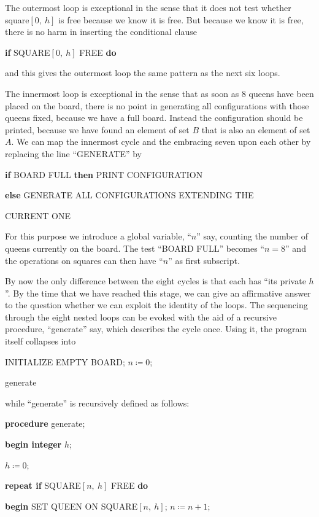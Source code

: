 The outermost loop is exceptional in the sense that it does not test whether square$[0,\ h]$ is free because we know it is free. But because we know it is free, there is no harm in inserting the conditional clause

\quad \textbf{if} SQUARE$[0,\ h]$ FREE \textbf{do}

\noindent
and this gives the outermost loop the same pattern as the next six loops.

The innermost loop is exceptional in the sense that as soon as 8 queens have been placed on the board, there is no point in generating all configurations with those queens fixed, because we have a full board. Instead the configuration should be printed, because we have found an element of set $B$ that is also an element of set $A$. We can map the innermost cycle and the embracing seven upon each other by replacing the line ``GENERATE'' by

\textbf{if} BOARD FULL \textbf{\textbf{then}} PRINT CONFIGURATION

\quad \textbf{else} GENERATE ALL CONFIGURATIONS EXTENDING THE

\quad\quad CURRENT ONE

For this purpose we introduce a global variable, ``$n$'' say, counting the number of queens currently on the board. The test ``BOARD FULL'' becomes ``$n = 8$'' and the operations on squares can then have ``$n$'' as first subscript.

By now the only difference between the eight cycles is that each has ``its private $h$''. By the time that we have reached this stage, we can give an affirmative answer to the question whether we can exploit the identity of the loops. The sequencing through the eight nested loops can be evoked with the aid of a recursive procedure, ``generate'' say, which describes the cycle once. Using it, the program itself collapses into

\quad INITIALIZE EMPTY BOARD; $n \coloneq 0$;

\quad generate

\noindent
while ``generate'' is recursively defined as follows:

\textbf{procedure} generate;

\textbf{begin integer} $h$;

$h \coloneq 0$;

\textbf{repeat if} SQUARE$[n,\ h]$ FREE \textbf{do}

\quad \textbf{\textbf{begin}} SET QUEEN ON SQUARE$[n,\ h]$; $n \coloneq n + 1$;

